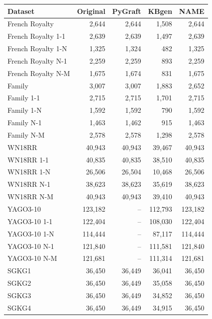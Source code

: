 \begin{tabular}{lrrrr}
\toprule
Dataset & Original & PyGraft & KBgen & NAME \\
\midrule
French Royalty & 2{,}644 & 2{,}644 & 1{,}508 & 2{,}644 \\
French Royalty 1-1 & 2{,}639 & 2{,}639 & 1{,}497 & 2{,}639 \\
French Royalty 1-N & 1{,}325 & 1{,}324 & 482 & 1{,}325 \\
French Royalty N-1 & 2{,}259 & 2{,}259 & 893 & 2{,}259 \\
French Royalty N-M & 1{,}675 & 1{,}674 & 831 & 1{,}675 \\
\midrule
Family & 3{,}007 & 3{,}007 & 1{,}883 & 2{,}652 \\
Family 1-1 & 2{,}715 & 2{,}715 & 1{,}701 & 2{,}715 \\
Family 1-N & 1{,}592 & 1{,}592 & 790 & 1{,}592 \\
Family N-1 & 1{,}463 & 1{,}462 & 915 & 1{,}463 \\
Family N-M & 2{,}578 & 2{,}578 & 1{,}298 & 2{,}578 \\
\midrule
WN18RR & 40{,}943 & 40{,}943 & 39{,}467 & 40{,}943 \\
WN18RR 1-1 & 40{,}835 & 40{,}835 & 38{,}510 & 40{,}835 \\
WN18RR 1-N & 26{,}506 & 26{,}504 & 10{,}468 & 26{,}506 \\
WN18RR N-1 & 38{,}623 & 38{,}623 & 35{,}619 & 38{,}623 \\
WN18RR N-M & 40{,}943 & 40{,}943 & 39{,}410 & 40{,}943 \\
\midrule
YAGO3-10 & 123{,}182 & – & 112{,}793 & 123{,}182 \\
YAGO3-10 1-1 & 122{,}404 & – & 108{,}030 & 122{,}404 \\
YAGO3-10 1-N & 114{,}444 & – & 87{,}117 & 114{,}444 \\
YAGO3-10 N-1 & 121{,}840 & – & 111{,}581 & 121{,}840 \\
YAGO3-10 N-M & 121{,}681 & – & 111{,}314 & 121{,}681 \\
\midrule
SGKG1 & 36{,}450 & 36{,}449 & 36{,}041 & 36{,}450 \\
SGKG2 & 36{,}450 & 36{,}449 & 35{,}058 & 36{,}450 \\
SGKG3 & 36{,}450 & 36{,}449 & 34{,}852 & 36{,}450 \\
SGKG4 & 36{,}450 & 36{,}449 & 34{,}915 & 36{,}450 \\
\bottomrule
\end{tabular}
